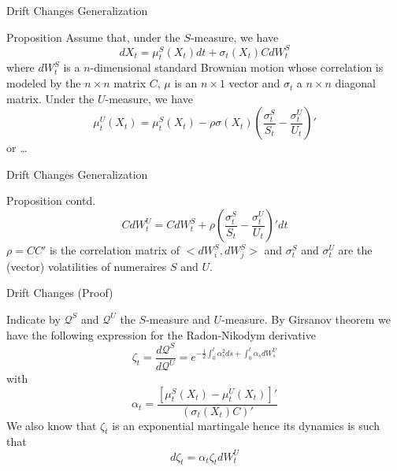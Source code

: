 \documentclass{beamer}
\begin{document}
\begin{frame}{Drift Changes Generalization}
  \begin{block}{Proposition}
    Assume that, under the $S$-measure, we have
    \begin{equation*}
      dX_t = \mu_t^S(X_t)dt + \sigma_t(X_t)CdW^S_t
    \end{equation*}
    where $dW^S_t$ is a $n$-dimensional standard Brownian motion whose correlation is modeled by the $n\times n$ matrix $C$, $\mu$ is an $n\times 1$ vector and $\sigma_t$ a $n\times n$ diagonal matrix. Under the $U$-measure, we have
    \begin{equation}
      \mu^U_t(X_t) = \mu^S_t(X_t) - \rho\sigma(X_t)\left(\frac{\sigma^S_t}{S_t}-\frac{\sigma^U_t}{U_t}\right)'
    \end{equation}
	or \ldots
	\end{block}
\end{frame}

\begin{frame}{Drift Changes Generalization}
	\begin{block}{Proposition contd.}
		\begin{equation}
			CdW^U_t = CdW^S_t + \rho\left(\frac{\sigma^S_t}{S_t}-\frac{\sigma^U_t}{U_t}\right)' dt
		\end{equation}
		$\rho=CC'$ is the correlation matrix of $<dW^S_i,dW^S_j>$ and $\sigma^S_t$ and $\sigma^U_t$ are the (vector) volatilities of numeraires $S$ and $U$. %
	\end{block}
\end{frame}

\begin{frame}{Drift Changes (Proof)}
  
  Indicate by $\mathcal{Q}^S$ and $\mathcal{Q}^U$ the $S$-measure and $U$-measure. By Girsanov theorem we have the following expression for the Radon-Nikodym derivative
  \begin{equation*}
    \zeta_t = \frac{d\mathcal{Q}^S}{d\mathcal{Q}^U} = e^{-\frac{1}{2}\int_0^t\alpha_s^2 ds + \int_0^t\alpha_s dW_s^U}
  \end{equation*}
  with 
  \begin{equation}
    \alpha_t=\frac{[\mu^S_t(X_t)-\mu_t^U(X_t)]'}{(\sigma_t(X_t)C)'}
    \label{eq:alpha_t}
  \end{equation}
	\pause
  We also know that $\zeta_t$ is an exponential martingale hence its dynamics is such that 
  \begin{equation}
    d\zeta_t=\alpha_t\zeta_tdW_t^U
    \label{eq:dzeta1}
  \end{equation}
\end{frame}
\end{document}
